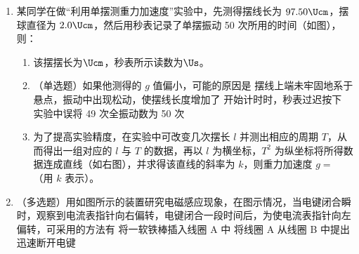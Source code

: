 \documentclass[\gkver]{gaokaozhenti}
\begin{document}
\begin{enumerate}
\item
某同学在做“利用单摆测重力加速度”实验中，先测得摆线长为 $97.50\Ucm$，摆球直径为 $2.0\Ucm$，然后用秒表记录了单摆振动 50 次所用的时间（如图），则：
\begin{enumerate}
	\item
	该摆摆长为$\Ucm$，秒表所示读数为$\Us$。
	\item
	（单选题）如果他测得的 $g$ 值偏小，可能的原因是
	{摆线上端未牢固地系于悬点，振动中出现松动，使摆线长度增加了}
	{开始计时时，秒表过迟按下}
	{实验中误将 49 次全振动数为 50 次}
	\item
	为了提高实验精度，在实验中可改变几次摆长 $l$ 并测出相应的周期 $T$，从而得出一组对应的 $l$ 与 $T$ 的数据，再以 $l$ 为横坐标，$T^{2}$ 为纵坐标将所得数据连成直线（如右图），并求得该直线的斜率为 $k$，则重力加速度 $g =$ （用 $k$ 表示）。
\end{enumerate}
\twopicture[labelA=1996上海23a, labelB=1996上海23b, align=right, wA=6.89cm, wB=6.00cm]
{}
{}

\item
（多选题）用如图所示的装置研究电磁感应现象，在图示情况，当电键闭合瞬时，观察到电流表指针向右偏转，电键闭合一段时间后，为使电流表指针向左偏转，可采用的方法有
\onepicture[align=right, w=7.50cm]{}
{将一软铁棒插入线圈 A 中}
{将线圈 A 从线圈 B 中提出}
{迅速断开电键}


\end{enumerate}
\end{document}
